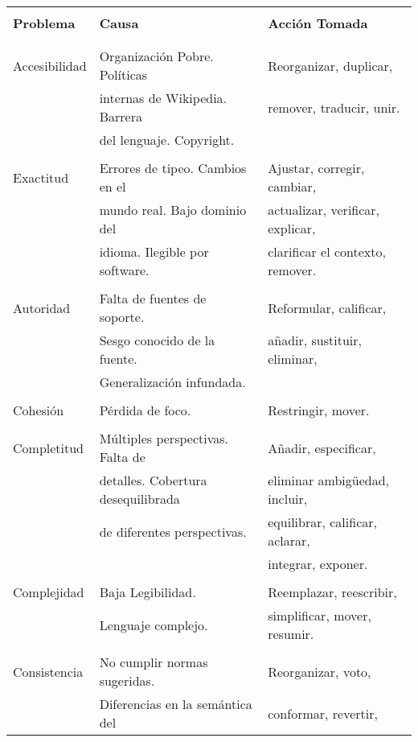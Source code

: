 \begin{table}
  \centering
   \begin{tabular}{ l l l }
	\hline
	& & \\
	   \textbf{Problema} & \textbf{Causa} & \textbf{Acci\'on Tomada} \\ \\
	\hline
	& & \\
		Accesibilidad & Organizaci\'on Pobre. Pol\'iticas  & Reorganizar, duplicar,  \\
		& internas de Wikipedia. Barrera  & remover, traducir, unir. \\
		& del lenguaje. Copyright. & \\ \\
		Exactitud & Errores de tipeo. Cambios en el & Ajustar, corregir, cambiar,  \\
		&  mundo real. Bajo dominio del & actualizar, verificar, explicar,\\
		& idioma. Ilegible por software. & clarificar el contexto, remover. \\ \\
		Autoridad & Falta de fuentes de soporte. & Reformular, calificar, \\
		& Sesgo conocido de la fuente. & a\~nadir, sustituir, eliminar, \\
		& Generalizaci\'on infundada.  &   \\ \\
     	          Cohesi\'on & P\'erdida de foco. & Restringir, mover. \\ \\
     	          Completitud & M\'ultiples perspectivas. Falta de &  A\~nadir, especificar, \\
     	          & detalles. Cobertura desequilibrada  &  eliminar ambig\"{u}edad, incluir, \\
     	          & de diferentes perspectivas. &  equilibrar, calificar, aclarar, \\
     	          & & integrar, exponer. \\ \\
     	          Complejidad &  Baja Legibilidad. & Reemplazar, reescribir,  \\
		& Lenguaje complejo. & simplificar, mover, resumir.  \\ \\
     	          Consistencia & No cumplir normas sugeridas. & Reorganizar, voto,  \\
     	          & Diferencias en la sem\'antica del  & conformar, revertir, \\

\end{tabular}
\end{table}
